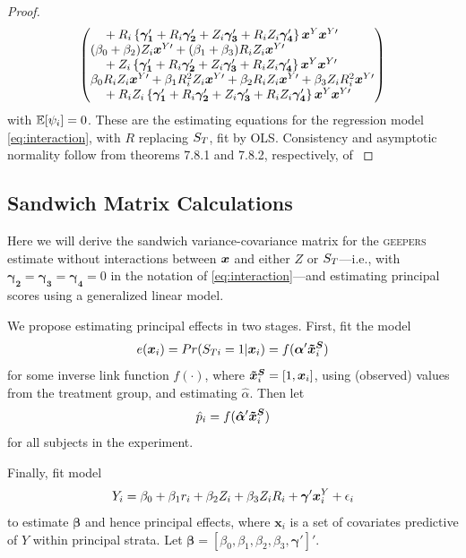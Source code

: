 \documentclass[]{article}
\begin{document}
\begin{proof}
\begin{equation*}
\begin{split}
\begin{pmatrix*}[l]
    \quad {}+\ri\left\{\bm{\gamma_1}'+R_i\bm{\gamma_2}'+Z_i\bm{\gamma_3}'+R_iZ_i\bm{\gamma_4}'\right\}\bxy\bxyt\\
        (\beta_0+\beta_2)Z_i\bxyt+(\beta_1+\beta_3)R_iZ_i\bxyt\\
    \quad {}+Z_i\left\{\bm{\gamma_1}'+R_i\bm{\gamma_2}'+Z_i\bm{\gamma_3}'+R_iZ_i\bm{\gamma_4}'\right\}\bxy\bxyt\\
\beta_0\ri Z_i\bxyt+\beta_1R_i^2Z_i\bxyt+\beta_2\ri Z_i\bxyt+\beta_3Z_iR_i^2\bxyt\\
    \quad {}+\ri Z_i\left\{\bm{\gamma_1}'+R_i\bm{\gamma_2}'+Z_i\bm{\gamma_3}'+R_iZ_i\bm{\gamma_4}'\right\}\bxy\bxyt\\
  \end{pmatrix*}
  \end{split}
\end{equation*}
with $\mathbb{E}[\psi_i]=0$.
These are the estimating equations for the regression model \eqref{eq:interaction}, with $R$ replacing $S_T$, fit by OLS.
Consistency and asymptotic normality follow from theorems 7.8.1 and 7.8.2, respectively, of \citet{boosStefanskiBook}
\end{proof}

\subsection*{Sandwich Matrix Calculations}

Here we will derive the sandwich variance-covariance matrix for the \textsc{geepers} estimate without interactions between $\bm{x}$ and either $Z$ or $S_T$---i.e., with $\bm{\gamma_2}=\bm{\gamma_3}=\bm{\gamma_4}=0$ in the notation of \eqref{eq:interaction}---and estimating principal scores using a generalized linear model.

We propose estimating principal effects in two stages.
First, fit the model
\begin{equation}\label{eq:psMod}
  e(\bm{x}_i)=Pr(S_{Ti}=1|\bm{x}_i)=f(\bm{\alpha}'\bm{\tilde{x}^S}_i)
\end{equation}
for some inverse link function $f(\cdot)$, where $\bm{\tilde{x}^S}_i=[1,\bm{x}_i]$, using (observed) values from the treatment group, and estimating $\hat{\alpha}$.
Then let
\begin{equation}\label{eq:ps}
  \hat{p}_i=f(\bm{\hat{\alpha}}'\bm{\tilde{x}^S}_i)
\end{equation}
for all subjects in the experiment.

Finally, fit model
\begin{equation}\label{eq:regression}
  Y_i=\beta_0+\beta_1r_i+\beta_2Z_i+\beta_3Z_iR_i+\bm{\gamma}'\bm{x}^Y_i+\epsilon_i
\end{equation}
to estimate $\bm{\beta}$ and hence principal effects, where $\bm{x}_i$ is a set of covariates predictive of $Y$ within principal strata.
Let $\bm{\beta}=[\beta_0,\beta_1,\beta_2,\beta_3,\bm{\gamma}']'$.
\end{document}

